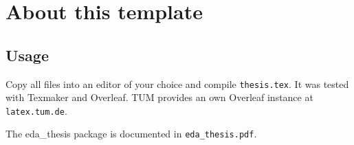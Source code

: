 \chapter{About this template}

\section{Usage}

Copy all files into an editor of your choice and compile \texttt{thesis.tex}. It was tested with Texmaker and Overleaf. TUM provides an own Overleaf instance at \texttt{latex.tum.de}.

The eda\_thesis package is documented in \texttt{eda\_thesis.pdf}.
